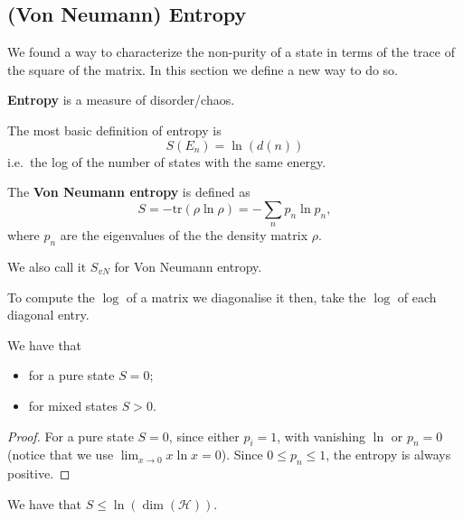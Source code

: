 \documentclass[12pt, a4paper]{article}
\newcommand{\hilbert}{\mathcal H}
\begin{document}
\subsection{(Von Neumann) Entropy}

We found a way to characterize the non-purity of a state in terms of the trace of the square of the matrix. In this section we define a new way to do so.

\begin{definition}
    \textbf{Entropy} is a measure of disorder/chaos.
\end{definition}

\begin{definition}
    The most basic definition of entropy is 
    \[S(E_n) = \ln(d(n))\] 
    i.e.\ the log of the number of states with the same energy.
\end{definition}

\begin{definition}
    The \textbf{Von Neumann entropy} is defined as 
    \[S = -\text{tr}(\rho \ln \rho) = -\sum_n p_n \ln p_n,\]
    where \(p_n\) are the eigenvalues of the the density matrix \(\rho\). 
\end{definition}

\begin{mdremark}
    We also call it \(S_{vN}\) for Von Neumann entropy.
\end{mdremark}

\begin{mdnote}
    To compute the \(\log\) of a matrix we diagonalise it then, take the \(\log\) of each diagonal entry.
\end{mdnote}

\begin{mdprop}
    We have that 
    \begin{itemize}
        \item for a pure state \( S = 0 \);
        \item for mixed states \(S >0\).
    \end{itemize}
\end{mdprop}

\begin{proof}
    For a pure state \( S = 0 \), since either \( p_i = 1 \), with vanishing \(\ln\) or \( p_n = 0 \) (notice that we use \(\lim_{x \to 0} x \ln x = 0\)). Since \( 0 \leq p_n \leq 1 \), the entropy is always positive.
\end{proof}

\begin{theorem}
    We have that \(S \leq \ln(\dim(\hilbert))\).
\end{theorem}
\end{document}
